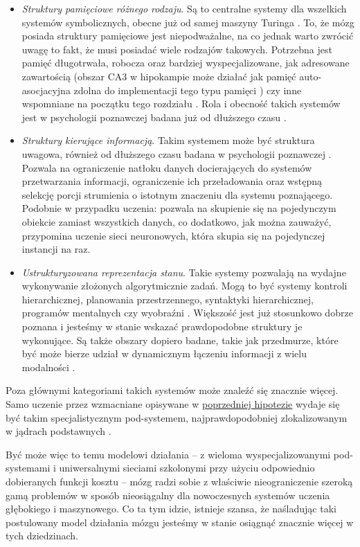 \begin{itemize}
	\item \emph{Struktury pamięciowe różnego rodzaju}.
	Są to centralne systemy dla wszelkich systemów symbolicznych, obecne już od samej maszyny Turinga \cite{turing1937computable}.
	To, że mózg posiada struktury pamięciowe jest niepodważalne, na co jednak warto zwrócić uwagę to fakt, że musi posiadać wiele rodzajów takowych.
	Potrzebna jest pamięć długotrwała, robocza oraz bardziej wyspecjalizowane, jak adresowane zawartością (obszar CA3 w hipokampie może działać jak pamięć auto-asocjacyjna zdolna do implementacji tego typu pamięci \cite{rolls2013mechanisms}) czy inne wspomniane na początku tego rozdziału \cite{graves2014neural}.
	Rola i obecność takich systemów jest w psychologii poznawczej badana już od dłuższego czasu \cite{baddeley2004psychology}.
	\item \emph{Struktury kierujące informacją}.
	Takim systemem może być struktura uwagowa, również od dłuższego czasu badana w psychologii poznawczej \cite{pashler1999psychology}.
	Pozwala na ograniczenie natłoku danych docierających do systemów przetwarzania informacji, ograniczenie ich przeładowania oraz wstępną selekcję porcji strumienia o istotnym znaczeniu dla systemu poznającego.
	Podobnie w przypadku uczenia: pozwala na skupienie się na pojedynczym obiekcie zamiast wszystkich danych, co dodatkowo, jak można zauważyć, przypomina uczenie sieci neuronowych, która skupia się na pojedynczej instancji na raz.
	\item \emph{Ustrukturyzowana reprezentacja stanu}.
	Takie systemy pozwalają na wydajne wykonywanie złożonych algorytmicznie zadań.
	Mogą to być systemy kontroli hierarchicznej, planowania przestrzennego, syntaktyki hierarchicznej, programów mentalnych czy wyobraźni \cite{marblestone2016toward}.
	Większość jest już stosunkowo dobrze poznana i jesteśmy w stanie wskazać prawdopodobne struktury je wykonujące.
	Są także obszary dopiero badane, takie jak przedmurze, które być może bierze udział w dynamicznym łączeniu informacji z wielu modalności \cite{crick2005function}.
\end{itemize}

Poza głównymi kategoriami takich systemów może znaleźć się znacznie więcej.
Samo uczenie przez wzmacniane opisywane w \hyperref[subsec:cost-function-is-diverse]{poprzedniej hipotezie} wydaje się być takim specjalistycznym pod-systemem, najprawdopodobniej zlokalizowanym w jądrach podstawnych \cite{doya1999computations}.

Być może więc to temu modelowi działania -- z wieloma wyspecjalizowanymi pod-systemami i uniwersalnymi sieciami szkolonymi przy użyciu odpowiednio dobieranych funkcji kosztu -- mózg radzi sobie z właściwie nieograniczenie szeroką gamą problemów w sposób nieosiągalny dla nowoczesnych systemów uczenia głębokiego i maszynowego.
Co ta tym idzie, istnieje szansa, że naśladując taki postulowany model działania mózgu jesteśmy w stanie osiągnąć znacznie więcej w tych dziedzinach.

